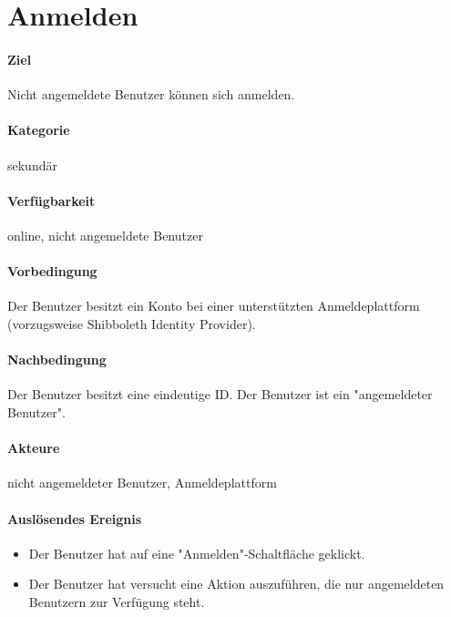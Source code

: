 \section{Anmelden}
\label{Anmeldefunktion}
\paragraph{Ziel}
Nicht angemeldete Benutzer können sich anmelden.
\paragraph{Kategorie}
sekundär
\paragraph{Verfügbarkeit}
online, nicht angemeldete Benutzer
\paragraph{Vorbedingung}
Der Benutzer besitzt ein Konto bei einer unterstützten Anmeldeplattform (vorzugsweise Shibboleth Identity Provider).
\paragraph{Nachbedingung}
Der Benutzer besitzt eine eindeutige ID. Der Benutzer ist ein "angemeldeter Benutzer".
\paragraph{Akteure}
nicht angemeldeter Benutzer, Anmeldeplattform
\paragraph{Auslösendes Ereignis}
\begin{itemize}
      \item Der Benutzer hat auf eine "Anmelden"-Schaltfläche geklickt.
      \item Der Benutzer hat versucht eine Aktion auszuführen, die nur angemeldeten Benutzern zur Verfügung steht.
\end{itemize}
